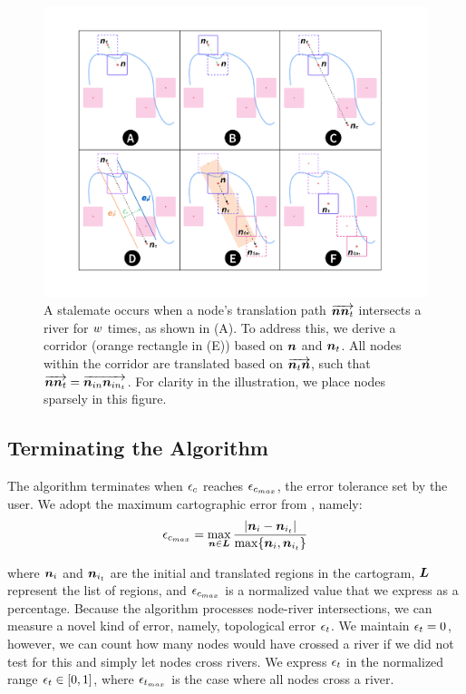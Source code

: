     {
        \begin{figure}[tb!]
            \centering
            \includegraphics[width=\columnwidth,keepaspectratio]{figure/corridor.png}
            \caption{A stalemate occurs when a node's translation path $ \protect\overrightarrow{\bm{n}\bm{n}_t} $ intersects a river for $ w $ times, as shown in (A). To address this, we derive a corridor (orange rectangle in (E)) based on $ \bm{n} $ and $ \bm{n}_t $. All nodes within the corridor are translated based on $ \protect\overrightarrow{\bm{n}_t\bm{n}} $, such that $ \protect\overrightarrow{\bm{n}\bm{n}_{t}} = \protect\overrightarrow{\bm{n}_{in}\bm{n}_{in_t}} $. For clarity in the illustration, we place nodes sparsely in this figure.}
            \label{fig:corridor}
        \end{figure}
    }


\subsection{Terminating the Algorithm}

The algorithm terminates when $ \epsilon_{c} $ reaches $ \epsilon_{c_{max}} $, the error tolerance set by the user. We adopt the maximum cartographic error from , namely: $$ \epsilon_{c_{max}} = \max _{\bm{n} \in \bm{L}} \frac{|\bm{n}_i-\bm{n}_{i_t}|}{\max \{\bm{n}_i, \bm{n}_{i_t}\}}
$$

where $ \bm{n}_i $ and $ \bm{n}_{i_t} $ are the initial and translated regions in the cartogram, $ \bm{L} $ represent the list of regions, and $ \epsilon_{c_{max}} $ is a normalized value that we express as a percentage.
Because the algorithm processes node-river intersections, we can measure a novel kind of error, namely, topological error $ \epsilon_{t} $. We maintain $ \epsilon_{t} = 0 $, however, we can count how many nodes would have crossed a river if we did not test for this and simply let nodes cross rivers. We express $ \epsilon_{t} $ in the normalized range $ \epsilon_{t} \in [0,1] $, where $ \epsilon_{t_{max}} $ is the case where all nodes cross a river.

